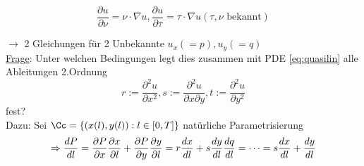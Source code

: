 \[
    \frac{\partial u}{\partial \nu} = \nu \cdot \nabla u, \frac{\partial u}{\partial \tau} = \tau \cdot \nabla u (\tau,\nu \text{ bekannt})
\]

$\to$ 2 Gleichungen für 2 Unbekannte $u_x (=p), u_y(=q)$\\

\underline{Frage}: Unter welchen Bedingungen legt dies zusammen mit PDE \eqref{eq:quasilin} alle Ableitungen 2.Ordnung 
\begin{equation} %
    r:=\frac{\partial^2 u}{\partial x^2}, s:= \frac{\partial^2 u}{\partial x\partial y}, t:=\frac{\partial^2 u}{\partial y^2}
    \label{}
\end{equation}
fest?\\

Dazu: Sei $\Cc = \left\{ (x(l), y(l)): l\in [0,T] \right\}$ natürliche Parametrisierung
\[
    \Rightarrow \frac{dP}{dl} = \frac{\partial P}{\partial x} \frac{\partial x}{\partial l} + \frac{\partial P}{\partial y} \frac{\partial y}{\partial l} = r \frac{dx}{dl} + s \frac{dy}{dl}\\
    \frac{dq}{dl} = \cdots = s \frac{dx}{dl} + \frac{dy}{dl}
\]
